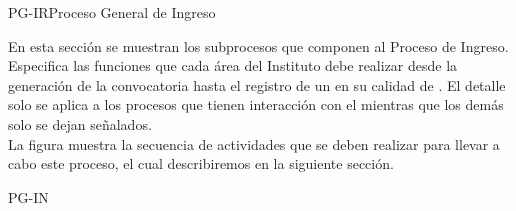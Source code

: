 \begin{procesoGeneral}{PG-IR}{Proceso General de Ingreso} {
		
	En esta sección se muestran los subprocesos que componen al Proceso de Ingreso. Especifica las funciones que cada área del Instituto debe realizar desde la generación de la convocatoria hasta el registro de un  en su calidad de . El detalle solo se aplica a los procesos que tienen interacción con el  mientras que los demás solo se dejan señalados.\\
					
	La figura  muestra la secuencia de actividades que se deben realizar para llevar a cabo este proceso, el cual describiremos en la siguiente sección.
		
	}{PG-IN}

\end{procesoGeneral}

